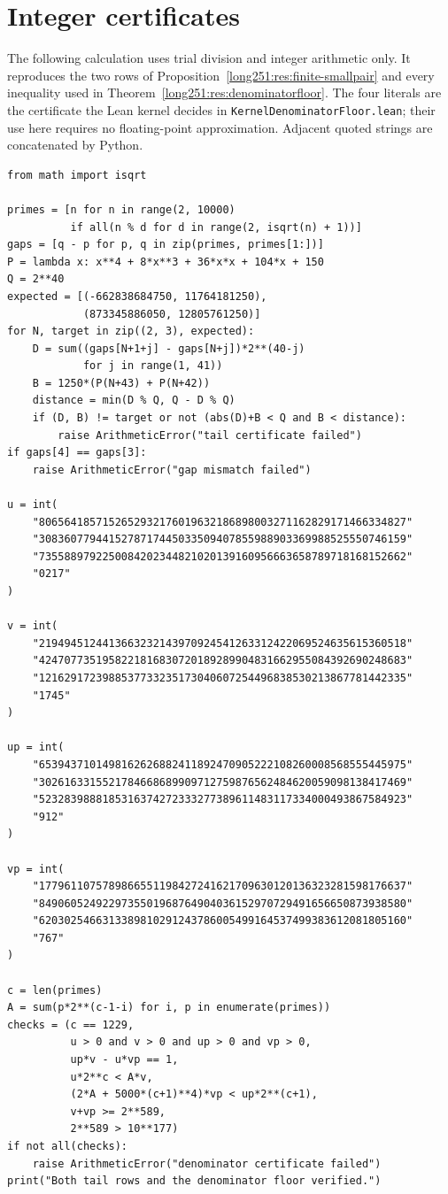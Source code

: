 \documentclass[11pt]{article}
\begin{document}
\section{Integer certificates}\label{long251:app:certificates}

The following calculation uses trial division and integer arithmetic only.  It
reproduces the two rows of Proposition~\ref{long251:res:finite-smallpair} and every
inequality used in Theorem~\ref{long251:res:denominatorfloor}.  The four literals are
the certificate the Lean kernel decides in
\texttt{KernelDenominatorFloor.lean}; their use here requires no
floating-point approximation.  Adjacent quoted strings are concatenated by
Python.
{\footnotesize
\begin{verbatim}
from math import isqrt

primes = [n for n in range(2, 10000)
          if all(n % d for d in range(2, isqrt(n) + 1))]
gaps = [q - p for p, q in zip(primes, primes[1:])]
P = lambda x: x**4 + 8*x**3 + 36*x*x + 104*x + 150
Q = 2**40
expected = [(-662838684750, 11764181250),
            (873345886050, 12805761250)]
for N, target in zip((2, 3), expected):
    D = sum((gaps[N+1+j] - gaps[N+j])*2**(40-j)
            for j in range(1, 41))
    B = 1250*(P(N+43) + P(N+42))
    distance = min(D % Q, Q - D % Q)
    if (D, B) != target or not (abs(D)+B < Q and B < distance):
        raise ArithmeticError("tail certificate failed")
if gaps[4] == gaps[3]:
    raise ArithmeticError("gap mismatch failed")

u = int(
    "8065641857152652932176019632186898003271162829171466334827"
    "3083607794415278717445033509407855988903369988525550746159"
    "7355889792250084202344821020139160956663658789718168152662"
    "0217"
)

v = int(
    "2194945124413663232143970924541263312422069524635615360518"
    "4247077351958221816830720189289904831662955084392690248683"
    "1216291723988537733235173040607254496838530213867781442335"
    "1745"
)

up = int(
    "6539437101498162626882411892470905222108260008568555445975"
    "3026163315521784668689909712759876562484620059098138417469"
    "5232839888185316374272333277389611483117334000493867584923"
    "912"
)

vp = int(
    "1779611075789866551198427241621709630120136323281598176637"
    "8490605249229735501968764904036152970729491656650873938580"
    "6203025466313389810291243786005499164537499383612081805160"
    "767"
)

c = len(primes)
A = sum(p*2**(c-1-i) for i, p in enumerate(primes))
checks = (c == 1229,
          u > 0 and v > 0 and up > 0 and vp > 0,
          up*v - u*vp == 1,
          u*2**c < A*v,
          (2*A + 5000*(c+1)**4)*vp < up*2**(c+1),
          v+vp >= 2**589,
          2**589 > 10**177)
if not all(checks):
    raise ArithmeticError("denominator certificate failed")
print("Both tail rows and the denominator floor verified.")
\end{verbatim}
}
\end{document}
